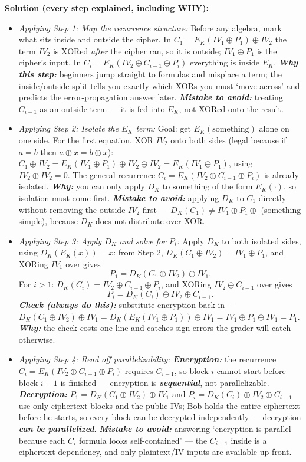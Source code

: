 \documentclass[12pt, a4paper]{article}
\newcommand{\term}[1]{\textbf{\textit{#1}}}        %
\begin{document}
\textbf{Solution (every step explained, including WHY):}
\begin{itemize}
    \item \textit{Applying Step 1: Map the recurrence structure:} Before any algebra, mark what sits inside and outside the cipher. In $C_1 = E_K(IV_1 \oplus P_1) \oplus IV_2$ the term $IV_2$ is XORed \emph{after} the cipher ran, so it is outside; $IV_1 \oplus P_1$ is the cipher's input. In $C_i = E_K(IV_2 \oplus C_{i-1} \oplus P_i)$ everything is inside $E_K$. \term{Why this step:} beginners jump straight to formulas and misplace a term; the inside/outside split tells you exactly which XORs you must `move across' and predicts the error-propagation answer later. \term{Mistake to avoid:} treating $C_{i-1}$ as an outside term --- it is fed into $E_K$, not XORed onto the result.
    \item \textit{Applying Step 2: Isolate the $E_K$ term:} Goal: get $E_K(\text{something})$ alone on one side. For the first equation, XOR $IV_2$ onto both sides (legal because if $a = b$ then $a \oplus x = b \oplus x$): $C_1 \oplus IV_2 = E_K(IV_1 \oplus P_1) \oplus IV_2 \oplus IV_2 = E_K(IV_1 \oplus P_1)$, using $IV_2 \oplus IV_2 = 0$. The general recurrence $C_i = E_K(IV_2 \oplus C_{i-1} \oplus P_i)$ is already isolated. \term{Why:} you can only apply $D_K$ to something of the form $E_K(\cdot)$, so isolation must come first. \term{Mistake to avoid:} applying $D_K$ to $C_1$ directly without removing the outside $IV_2$ first --- $D_K(C_1) \neq IV_1 \oplus P_1 \oplus$ (something simple), because $D_K$ does not distribute over XOR.
    \item \textit{Applying Step 3: Apply $D_K$ and solve for $P_i$:} Apply $D_K$ to both isolated sides, using $D_K(E_K(x)) = x$: from Step 2, $D_K(C_1 \oplus IV_2) = IV_1 \oplus P_1$, and XORing $IV_1$ over gives \[ P_1 = D_K(C_1 \oplus IV_2) \oplus IV_1. \] For $i > 1$: $D_K(C_i) = IV_2 \oplus C_{i-1} \oplus P_i$, and XORing $IV_2 \oplus C_{i-1}$ over gives \[ P_i = D_K(C_i) \oplus IV_2 \oplus C_{i-1}. \] \term{Check (always do this):} substitute encryption back in --- $D_K(C_1 \oplus IV_2) \oplus IV_1 = D_K(E_K(IV_1 \oplus P_1)) \oplus IV_1 = IV_1 \oplus P_1 \oplus IV_1 = P_1$. \term{Why:} the check costs one line and catches sign errors the grader will catch otherwise.
    \item \textit{Applying Step 4: Read off parallelizability:} \term{Encryption:} the recurrence $C_i = E_K(IV_2 \oplus C_{i-1} \oplus P_i)$ requires $C_{i-1}$, so block $i$ cannot start before block $i - 1$ is finished --- encryption is \term{sequential}, not parallelizable. \term{Decryption:} $P_1 = D_K(C_1 \oplus IV_2) \oplus IV_1$ and $P_i = D_K(C_i) \oplus IV_2 \oplus C_{i-1}$ use only ciphertext blocks and the public IVs; Bob holds the entire ciphertext before he starts, so every block can be decrypted independently --- decryption \term{can be parallelized}. \term{Mistake to avoid:} answering `encryption is parallel because each $C_i$ formula looks self-contained' --- the $C_{i-1}$ inside is a ciphertext dependency, and only plaintext/IV inputs are available up front.

\end{itemize}
\end{document}
